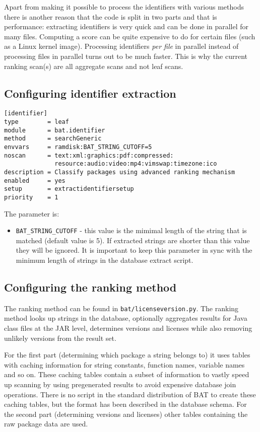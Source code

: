\documentclass[10pt,a4paper]{article}
\begin{document}
Apart from making it possible to process the identifiers with various methods
there is another reason that the code is split in two parts and that is
performance: extracting identifiers is very quick and can be done in parallel
for many files. Computing a score can be quite expensive to do for certain
files (such as a Linux kernel image). Processing identifiers \textit{per file}
in parallel instead of processing files in parallel turns out to be much faster.
This is why the current ranking scan(s) are all aggregate scans and not leaf
scans.

\subsection{Configuring identifier extraction}

\begin{verbatim}
[identifier]
type        = leaf
module      = bat.identifier
method      = searchGeneric
envvars     = ramdisk:BAT_STRING_CUTOFF=5
noscan      = text:xml:graphics:pdf:compressed:
              resource:audio:video:mp4:vimswap:timezone:ico
description = Classify packages using advanced ranking mechanism
enabled     = yes
setup       = extractidentifiersetup
priority    = 1
\end{verbatim}

The parameter is:

\begin{itemize}
\item \texttt{BAT\_STRING\_CUTOFF} - this value is the mimimal length of the
string that is matched (default value is 5). If extracted strings are shorter
than this value they will be ignored. It is important to keep this parameter in
sync with the minimum length of strings in the database extract script.
\end{itemize}

\subsection{Configuring the ranking method}

The ranking method can be found in \texttt{bat/licenseversion.py}. The ranking
method looks up strings in the database, optionally aggregates results for
Java class files at the JAR level, determines versions and licenses while also
removing unlikely versions from the result set.

For the first part (determining which package a string belongs to) it uses
tables with caching information for string constants, function names, variable
names and so on. These caching tables contain a subset of information to vastly
speed up scanning by using pregenerated results to avoid expensive database
join operations. There is no script in the standard distribution of BAT to
create these caching tables, but the format has been described in the database
schema. For the second part (determining versions and licenses) other tables
containing the raw package data are used.
\end{document}
